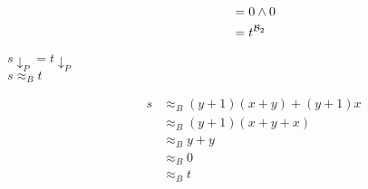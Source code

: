 \begin{description}
\begin{align*}
			        & =0\wedge 0                                                                                                                                                                                                                                          \\
			        & =t^{\mathcal{B}_2}                                                                                                                                                                                                                                            
		\end{align*}
		\item[$s{\downarrow_P}=t{\downarrow_P}$] 
		\item[$s\approx_B t$] 
		\begin{align*}
			s & \approx_B (y+1)(x+y)+(y+1)x \\
			  & \approx_B (y+1)(x+y+x)      \\
			  & \approx_B y+y               \\
			  & \approx_B 0                 \\
			  & \approx_B t                 \\
		\end{align*}
	\end{description}
